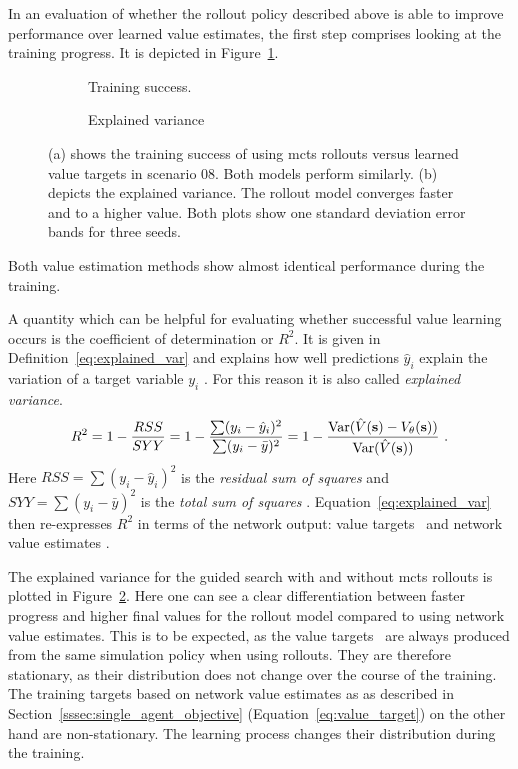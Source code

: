 In an evaluation of whether the rollout policy described above is able to improve performance over learned value estimates, the first step comprises looking at the training progress. It is depicted in Figure~\ref{fig:sc10_rollout_success}.
\begin{figure}
\begin{subfigure}{.5\textwidth}
  \centering
  \scalebox{0.55}{
  
  }
  \caption{Training success.}
  \label{fig:sc10_rollout_success}
\end{subfigure}
\begin{subfigure}{.5\textwidth}
  \centering
  \scalebox{0.55}{
  
  }
  \caption{Explained variance}
  \label{fig:sc10_rollout_explained_var}
\end{subfigure}
\caption[Rollout training and explained variance]{(a) shows the training success of using \gls{mcts} rollouts versus learned value targets in scenario 08. Both models perform similarly. (b) depicts the explained variance. The rollout model converges faster and to a higher value. Both plots show one standard deviation error bands for three seeds.}
\label{fig:rollout_plots}
\end{figure}
Both value estimation methods show almost identical performance during the training.

A quantity which can be helpful for evaluating whether successful value learning occurs is the coefficient of determination or $R^2$. It is given in Definition~\ref{eq:explained_var} and explains how well predictions $\hat y_i$ explain the variation of a target variable $y_i$ \cite{weisbergAppliedLinearRegression}. For this reason it is also called \emph{explained variance}.
\begin{gather}\label{eq:explained_var}
    R^2 = 1 - \frac{RSS}{SYY} = 1 - \frac{\sum (y_i - \hat y_i)^2}{\sum (y_i - \bar y)^2} = 1- \frac{\var(\Vtarget - \Vest)}{\var(\Vtarget)}~.
\end{gather}
Here $RSS = \sum (y_i - \hat y_i)^2$ is the \emph{residual sum of squares} and $SYY = \sum (y_i - \bar y)^2$ is the \emph{total sum of squares} \cite{weisbergAppliedLinearRegression}. Equation~\ref{eq:explained_var} then re-expresses $R^2$ in terms of the network output: value targets \Vtarget\ and network value estimates \Vest.

The explained variance for the guided search with and without \gls{mcts} rollouts is plotted in Figure~\ref{fig:sc10_rollout_explained_var}. Here one can see a clear differentiation between faster progress and higher final values for the rollout model compared to using network value estimates. This is to be expected, as the value targets \Vtarget\ are always produced from the same simulation policy when using rollouts. They are therefore stationary, as their distribution does not change over the course of the training. The training targets based on network value estimates as as described in Section~\ref{sssec:single_agent_objective} (Equation~\ref{eq:value_target}) on the other hand are non-stationary. The learning process changes their distribution during the training.

